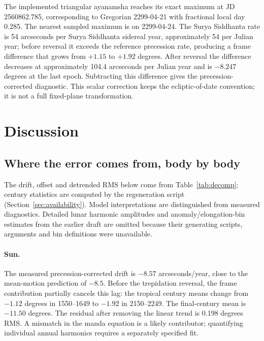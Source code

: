 \documentclass[11pt,a4paper]{article}
\begin{document}
The implemented triangular ayanamsha reaches its exact maximum at JD 2560862.785, corresponding to Gregorian 2299-04-21 with fractional local day 0.285. The nearest sampled maximum is on 2299-04-24. The Surya Siddhanta rate is 54 arcseconds per Surya Siddhanta sidereal year, approximately 54 per Julian year; before reversal it exceeds the reference precession rate, producing a frame difference that grows from $+1.15$ to $+1.92$ degrees. After reversal the difference decreases at approximately 104.4 arcseconds per Julian year and is $-8.247$ degrees at the last epoch. Subtracting this difference gives the precession-corrected diagnostic. This scalar correction keeps the ecliptic-of-date convention; it is not a full fixed-plane transformation.

\section{Discussion}
\label{sec:discussion}

\subsection{Where the error comes from, body by body}
\label{sec:bodies}

The drift, offset and detrended RMS below come from Table~\ref{tab:decomp}; century statistics are computed by the regeneration script (Section~\ref{sec:availability}). Model interpretations are distinguished from measured diagnostics. Detailed lunar harmonic amplitudes and anomaly/elongation-bin estimates from the earlier draft are omitted because their generating scripts, arguments and bin definitions were unavailable.

\paragraph{Sun.} The measured precession-corrected drift is $-8.57$ arcseconds/year, close to the mean-motion prediction of $-8.5$. Before the trepidation reversal, the frame contribution partially cancels this lag: the tropical century means change from $-1.12$ degrees in 1550--1649 to $-1.92$ in 2150--2249. The final-century mean is $-11.50$ degrees. The residual after removing the linear trend is 0.198 degrees RMS. A mismatch in the manda equation is a likely contributor; quantifying individual annual harmonics requires a separately specified fit.
\end{document}
